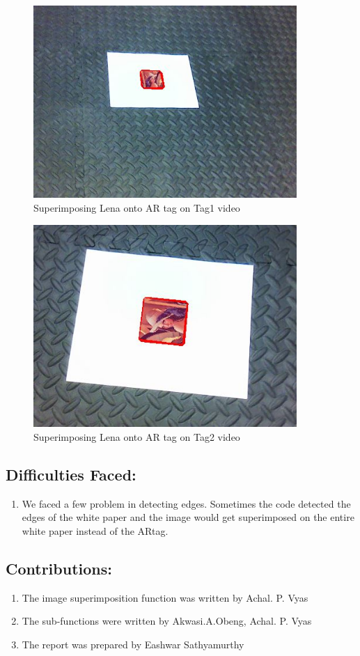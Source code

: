\documentclass[12pt]{article}
\begin{document}
\begin{enumerate}
\begin{figure}[h]
    \centering
    \includegraphics[width=10cm]{Tag1_videooutput}
    \caption{Superimposing Lena onto AR tag on Tag1 video}
    \label{fig:video frame output}
\end{figure}
\newpage
\begin{figure}[h]
    \centering
    \includegraphics[width=10cm]{Tag2_videooutput}
    \caption{Superimposing Lena onto AR tag on Tag2 video}
    \label{fig:video frame output}
\end{figure}
\end{enumerate}
\subsection{Difficulties Faced:}
\begin{enumerate}
\item We faced a few problem in detecting edges. Sometimes the code detected the edges of the white paper and the image would get superimposed on the entire white paper instead of the ARtag.
\end{enumerate}
\subsection{Contributions:}
\begin{enumerate}
\item The image superimposition function was written by Achal. P. Vyas
\item The sub-functions were written by Akwasi.A.Obeng, Achal. P. Vyas 
\item The report was prepared by Eashwar Sathyamurthy

\end{enumerate}
\newpage
\end{document}

